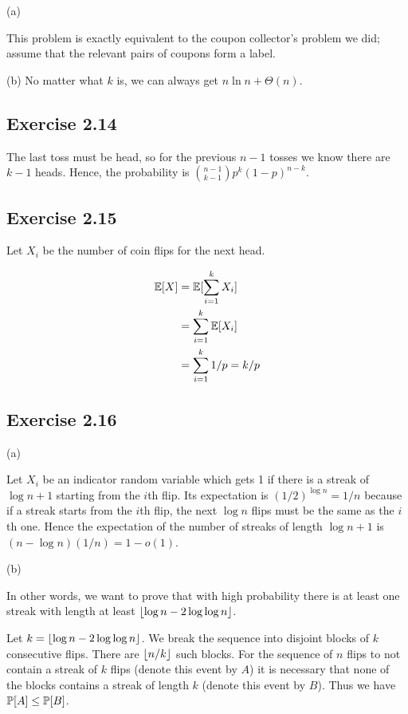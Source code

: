 (a)

This problem is exactly equivalent to the coupon collector’s problem we did; assume that the
relevant pairs of coupons form a label. 

(b) No matter what $k$ is, we can always get $n\ln n + \Theta(n)$.

\subsection*{Exercise 2.14}

The last toss must be head, so for the previous $n-1$ tosses we know there are $k-1$ heads.
Hence, the probability is $\binom{n-1}{k-1} p^k(1-p)^{n-k}$.

\subsection*{Exercise 2.15}

Let $X_i$ be the number of coin flips for the next head. 

\begin{equation*}
\begin{split}
\E[X] & = \E[\sum_{i = 1}^{k} X_i] \\
& = \sum_{i=1}^{k} \E[X_i] \\
& = \sum_{i=1}^{k} 1/p = k/p
\end{split}
\end{equation*}

\subsection*{Exercise 2.16}

(a)

Let $X_i$ be an indicator random variable which gets 1 if there is a streak of $\log n + 1$ starting
from the $i$th flip. Its expectation is $(1/2)^{\log n} = 1/n$ because if a streak starts from the
$i$th flip, the next $\log n$ flips must be the same as the $i$th one. Hence the expectation of the number
of streaks of length $\log n + 1$ is $(n - \log n)(1/n) = 1 - o(1)$.


\noindent (b)

In other words, we want to prove that with high probability there is at least one streak with length
at least $\floor{\log n - 2\log \log n}$.

Let $k = \floor{\log n - 2\log \log n}$. We break the sequence into disjoint blocks of $k$ consecutive
flips. There are $\floor{n/k}$ such blocks. For the sequence of $n$ flips to not contain a streak of
$k$ flips (denote this event by $A$) it is necessary that none of the blocks contains a streak of length
$k$ (denote this event by $B$). Thus we have $\P[A] \leq \P[B]$. 

